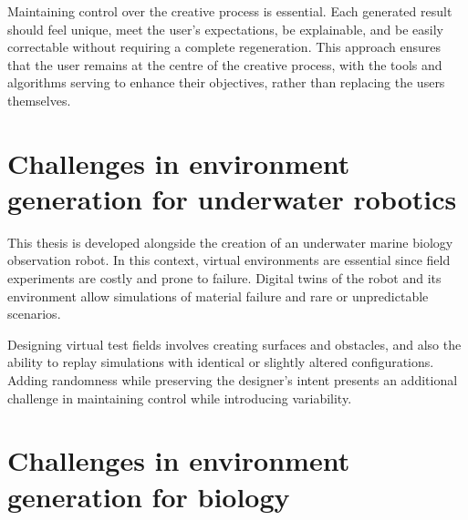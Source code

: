 Maintaining control over the creative process is essential. Each generated result should feel unique, meet the user's expectations, be explainable, and be easily correctable without requiring a complete regeneration. This approach ensures that the user remains at the centre of the creative process, with the tools and algorithms serving to enhance their objectives, rather than replacing the users themselves.

\section{Challenges in environment generation for underwater robotics}

This thesis is developed alongside the creation of an underwater marine biology observation robot. In this context, virtual environments are essential since field experiments are costly and prone to failure. Digital twins of the robot and its environment allow simulations of material failure and rare or unpredictable scenarios.


Designing virtual test fields involves creating surfaces and obstacles, and also the ability to replay simulations with identical or slightly altered configurations. Adding randomness while preserving the designer's intent presents an additional challenge in maintaining control while introducing variability.

\section{Challenges in environment generation for biology}

